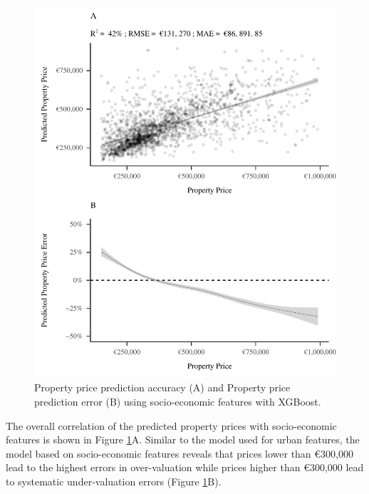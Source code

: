 \documentclass[conference,final,]{IEEEtran}
\begin{document}
\begin{figure}
\includegraphics[width=0.98\columnwidth]{dsaa_application_manuscript_files/figure-latex/census-features-xgb-1} \caption{Property price prediction accuracy (A) and Property price prediction error (B) using socio-economic features with XGBoost.}\label{fig:census-features-xgb}
\end{figure}

The overall correlation of the predicted property prices with socio-economic features is shown in Figure \ref{fig:census-features-xgb}A. Similar to the model used for urban features, the model based on socio-economic features reveals that prices lower than €300,000 lead to the highest errors in over-valuation while prices higher than €300,000 lead to systematic under-valuation errors (Figure \ref{fig:census-features-xgb}B).
\end{document}
